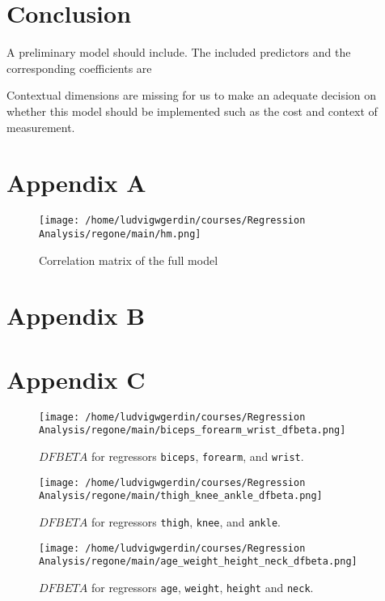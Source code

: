 \documentclass[11pt]{article}
\begin{document}
\section{Conclusion}
\label{sec:org32da6ae}

A preliminary model should include. The included predictors and the corresponding coefficients are 

Contextual dimensions are missing for us to make an adequate decision on whether this model should be implemented
such as the cost and context of measurement.

\section{Appendix A}
\label{sec:org3f63af2}

\begin{figure}[H]
\centering
\texttt{[image: /home/ludvigwgerdin/courses/Regression Analysis/regone/main/hm.png]}
\caption{\label{fig:org9b870c1}
Correlation matrix of the full model}
\end{figure}

\newpage

\section{Appendix B}
\label{sec:orgd9225c0}
\section{Appendix C}
\label{sec:orga5afe3d}

\begin{figure}[H]
\centering
\texttt{[image: /home/ludvigwgerdin/courses/Regression Analysis/regone/main/biceps\_forearm\_wrist\_dfbeta.png]}
\caption{\label{fig:org8ce9f1d}
\(DFBETA\) for regressors \texttt{biceps}, \texttt{forearm}, and \texttt{wrist}.}
\end{figure}

\begin{figure}[H]
\centering
\texttt{[image: /home/ludvigwgerdin/courses/Regression Analysis/regone/main/thigh\_knee\_ankle\_dfbeta.png]}
\caption{\label{fig:orgea29e3d}
\(DFBETA\) for regressors \texttt{thigh}, \texttt{knee}, and \texttt{ankle}.}
\end{figure}

\begin{figure}[H]
\centering
\texttt{[image: /home/ludvigwgerdin/courses/Regression Analysis/regone/main/age\_weight\_height\_neck\_dfbeta.png]}
\caption{\label{fig:org39c2a3e}
\(DFBETA\) for regressors \texttt{age}, \texttt{weight}, \texttt{height} and \texttt{neck}.}
\end{figure}
\end{document}
